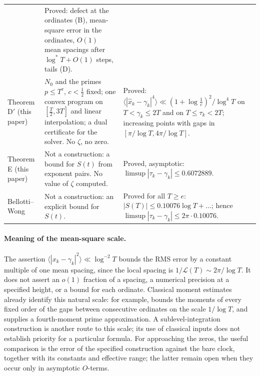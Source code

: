 \documentclass[preprint,12pt]{elsarticle}
\numberwithin{equation}{section}
\theoremstyle{plain}
\theoremstyle{definition}
\theoremstyle{remark}
\newcommand{\NO}{N_0}
\newcommand{\lL}{\mathcal L}
\begin{document}
\begin{longtable}{@{}p{}p{}p{}@{}}
& Proved: defect at the ordinates (B), mean-square error in the ordinates, $O(1)$ mean spacings after $\log^*T+O(1)$ steps, tails (D).\\
Theorem D$'$ (this paper)
& $\NO$ and the primes $p\le T^c$, $c<\frac12$ fixed; one convex program on $[\frac T2,3T]$ and linear interpolation; a dual certificate for the solver. No $\zeta$, no zero.
& Proved: $\langle|\widehat x_k-\gamma_k|^4\rangle\ll(1+\log\frac1c)^2/\log^4T$ on $T<\gamma_k\le2T$ and on $T\le\tau_k<2T$; increasing points with gaps in $[\pi/\log T,4\pi/\log T]$.\\
Theorem E (this paper)
& Not a construction: a bound for $S(t)$ from exponent pairs. No value of $\zeta$ computed.
& Proved, asymptotic: $\limsup|\tau_k-\gamma_k|\le0.6072889$.\\
Bellotti--Wong \cite{BellottiWong2025}
& Not a construction: an explicit bound for $S(t)$.
& Proved for all $T\ge e$: $|S(T)|\le0.10076\log T+\ldots$; hence $\limsup|\tau_k-\gamma_k|\le2\pi\cdot0.10076$.\\
\end{longtable}
\endgroup

\paragraph{Meaning of the mean-square scale.}\label{par:meansquare_scope}
The assertion $\langle|x_k-\gamma_k|^2\rangle\ll\log^{-2}T$ bounds the RMS error by a constant multiple of one mean spacing, since the local spacing is $1/\lL(T)\sim2\pi/\log T$. It does not assert an $o(1)$ fraction of a spacing, a numerical precision at a specified height, or a bound for each ordinate. Classical moment estimates already identify this natural scale: for example, \cite[\S9.25, (9.25.4)]{Titchmarsh1986} bounds the moments of every fixed order of the gaps between consecutive ordinates on the scale $1/\log T$, and \cite[(3.6)]{FazzariGerspachMinelli2025} supplies a fourth-moment prime approximation. A sublevel-integration construction is another route to this scale; its use of classical inputs does not establish priority for a particular formula. For approaching the zeros, the useful comparison is the error of the specified construction against the bare clock, together with its constants and effective range; the latter remain open when they occur only in asymptotic $O$-terms.
\end{document}
